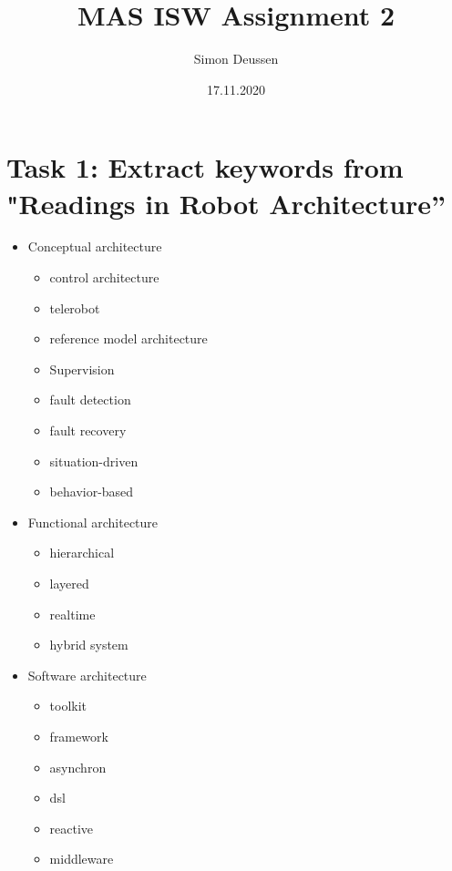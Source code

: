 \documentclass{article}
\title{MAS ISW Assignment 2}
\date{17.11.2020}
\author{Simon Deussen}
\begin{document}
  \maketitle

  \section*{Task 1: Extract keywords from "Readings in Robot Architecture”}
  \begin{itemize}
      \item Conceptual architecture
      \begin{itemize}
          \item control architecture 
          \item telerobot
          \item reference model architecture
          \item Supervision
          \item fault detection
          \item fault recovery
          \item situation-driven
          \item behavior-based
      \end{itemize} 

      \item Functional architecture
      \begin{itemize}
          \item hierarchical
          \item layered
          \item realtime
          \item hybrid system
      \end{itemize} 
      \item Software architecture
      \begin{itemize}
          \item toolkit
          \item framework
          \item asynchron
          \item dsl
          \item reactive
          \item middleware
  
      \end{itemize} 


\end{itemize}
\end{document}
